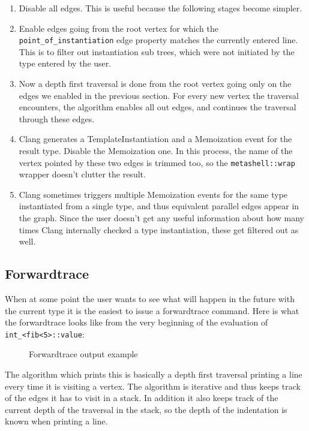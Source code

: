 \begin{enumerate}
    \item
        Disable all edges. This is useful because the following stages become
        simpler.
    \item
        Enable edges going from the root vertex for which the
        \texttt{point\_of\_instantiation} edge property matches the currently
        entered line. This is to filter out instantiation sub trees, which were
        not initiated by the type entered by the user.
    \item
        Now a depth first traversal is done from the root vertex going only on
        the edges we enabled in the previous section. For every new vertex the
        traversal encounters, the algorithm enables all out edges, and
        continues the traversal through these edges.
    \item
        Clang generates a TemplateInstantiation and a Memoization event for the
        result type. Disable the Memoization one. In this process, the name of
        the vertex pointed by these two edges is trimmed too, so the
        \texttt{metashell::wrap} wrapper doesn't clutter the result.
    \item
        Clang sometimes triggers multiple Memoization events for the same type
        instantiated from a single type, and thus equivalent parallel edges
        appear in the graph. Since the user doesn't get any useful information
        about how many times Clang internally checked a type instantiation,
        these get filtered out as well.
\end{enumerate}

\subsection{Forwardtrace}

When at some point the user wants to see what will happen in the future with
the current type it is the easiest to issue a forwardtrace command. Here is
what the forwardtrace looks like from the very beginning of the evaluation of
\texttt{int\_<fib<5>::value}:

\bigskip

\begin{figure}[H]
    
    \caption{Forwardtrace output example}
\end{figure}

\noindent
The algorithm which prints this is basically a depth first traversal printing
a line every time it is visiting a vertex. The algorithm is iterative and thus
keeps track of the edges it has to visit in a stack. In addition it also keeps
track of the current depth of the traversal in the stack, so the depth of the
indentation is known when printing a line.

